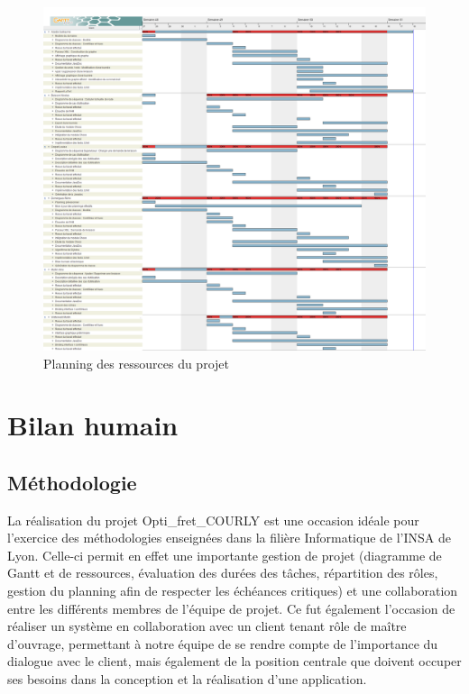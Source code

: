 \begin{landscape}
\begin{figure}[h]
    \centering
    \includegraphics[width=180mm]{../diagrams/project_management/planning_effectif/planning_ressources.png}
    \caption{Planning des ressources du projet}
    \label{diagram:planning_ressource}
\end{figure}
\end{landscape}
\pagebreak


\section{Bilan humain}
\subsection{Méthodologie}
La réalisation du projet Opti\_fret\_COURLY est une occasion idéale pour l’exercice des méthodologies enseignées dans la filière Informatique de l’INSA de Lyon. Celle-ci permit en effet une importante gestion de projet (diagramme de Gantt et de ressources, évaluation des durées des tâches, répartition des rôles, gestion du planning afin de respecter les échéances critiques) et une collaboration entre les différents membres de l’équipe de projet. Ce fut également l’occasion de réaliser un système en collaboration avec un client tenant rôle de maître d’ouvrage, permettant à notre équipe de se rendre compte de l’importance du dialogue avec le client, mais également de la position centrale que doivent occuper ses besoins dans la conception et la réalisation d’une application.

